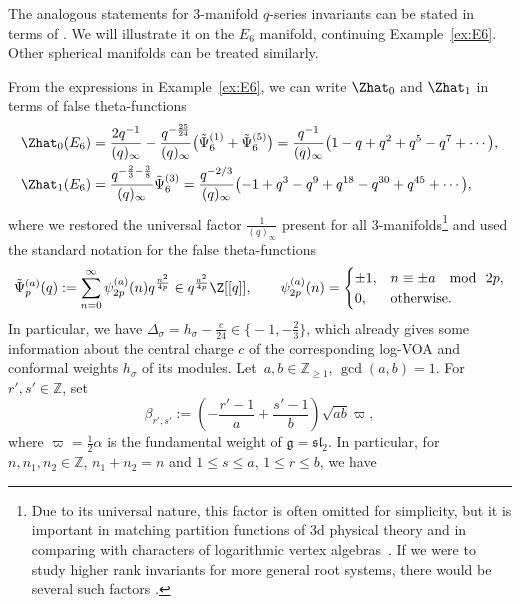 \documentclass[10pt,a4paper]{amsart}
\begin{document}
The analogous statements for 3-manifold $q$-series invariants can be stated in terms of . We will illustrate it on the $E_6$ manifold, continuing Example~\ref{ex:E6}. Other spherical manifolds can be treated similarly.
\begin{Example}
	From the expressions in Example~\ref{ex:E6}, we can write $\Zhat_0$ and $\Zhat_1$ in terms of false theta-functions
	\begin{align}
		\Zhat_0 (E_6) & = \frac{2 q^{-1}}{(q)_{\infty}} - \frac{q^{- \frac{25}{24}}}{(q)_{\infty}} \bigl( \tilde \Psi^{(1)}_6 + \tilde \Psi^{(5)}_6 \bigr) = \frac{q^{-1}}{(q)_{\infty}} \bigl(
		1 - q + q^2 + q^5 - q^7
		+ \cdots \bigr),
		\nonumber\\
		\Zhat_1 (E_6) & = \frac{q^{ - \frac{2}{3} - \frac{3}{8}}}{(q)_{\infty}} \tilde \Psi^{(3)}_6 = \frac{q^{-2/3}}{(q)_{\infty}} \bigl(
		-1 + q^3 - q^9 + q^{18} - q^{30} + q^{45}
		+ \cdots \bigr) ,\label{ZhatE6}
	\end{align}
	where we restored the universal factor $\frac{1}{(q)_{\infty}}$ present for all 3-manifolds\footnote{Due to its universal nature, this factor is often omitted for simplicity, but it is important in matching partition functions of 3d physical theory \cite{GPPV20} and in comparing with characters of logarithmic vertex algebras~\cite{CCFGH18, CCFFGHP22, Sug22}. If we were to study higher rank invariants for more general root systems, there would be several such factors \cite{Pa20a}.} and used the standard notation for the false theta-functions
	\begin{gather}
		\tilde \Psi^{(a)}_p (q) : = \sum_{n = 0}^\infty \psi^{(a)}_{2p}(n) q^{\frac{n^2}{4p}} \in q^\frac{a^2}{4p} \Z[[q]],
		\qquad
		\psi^{(a)}_{2p}(n) =
		\begin{cases}
			\pm 1, & n\equiv \pm a~\mod~ 2p , \\
			0, & \text{otherwise}.
		\end{cases} \label{falsetheta}
	\end{gather}
	In particular, we have
$\Delta_\sigma = h_\sigma - \frac{c}{24} \in \bigl\{ -1 , - \tfrac{2}{3} \bigr\}$,
	which already gives some information about the central charge $c$ of the corresponding log-VOA and conformal weights $h_\sigma$ of its modules. Let~${a, b \in \mathbb{Z}_{\geq 1}}$, $\gcd(a, b) = 1$. For $r', s' \in \mathbb{Z}$, set
\[
\beta_{r',s'} := \left( -\frac{r'-1}{a} + \frac{s'-1}{b} \right) \sqrt{ab}\varpi,
\]
where $\varpi = \frac{1}{2}\alpha$ is the fundamental weight of $\mathfrak{g} = \mathfrak{sl}_2$. In particular, for $n, n_1, n_2 \in \mathbb{Z}$, $n_1 + n_2 = n$ and $1 \leq s \leq a$, $1 \leq r \leq b$, we have

\end{Example}
\end{document}
